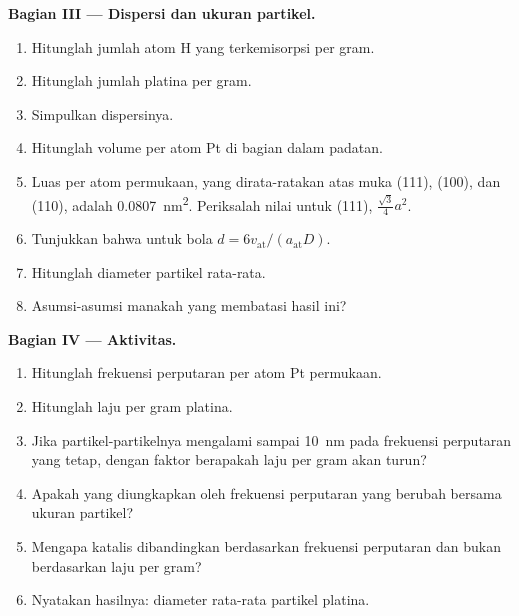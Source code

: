 \begin{problem}
\medskip\noindent\textbf{Bagian III --- Dispersi dan ukuran partikel.}
\begin{enumerate}[resume, beginpenalty=10000]
  \item Hitunglah jumlah atom H yang terkemisorpsi per gram.
  \item Hitunglah jumlah platina per gram.
  \item Simpulkan dispersinya.
  \item Hitunglah volume per atom Pt di bagian dalam padatan.
  \item Luas per atom permukaan, yang dirata-ratakan atas muka (111), (100), dan (110),
        adalah \qty{0.0807}{nm^2}. Periksalah nilai untuk (111), $\frac{\sqrt3}{4}a^2$.
  \item Tunjukkan bahwa untuk bola $d = 6v_{\mathrm{at}}/(a_{\mathrm{at}}D)$.
  \item Hitunglah diameter partikel rata-rata.
  \item Asumsi-asumsi manakah yang membatasi hasil ini?
\end{enumerate}

\medskip\noindent\textbf{Bagian IV --- Aktivitas.}
\begin{enumerate}[resume, beginpenalty=10000]
  \item Hitunglah frekuensi perputaran per atom Pt permukaan.
  \item Hitunglah laju per gram platina.
  \item Jika partikel-partikelnya mengalami  sampai \qty{10}{nm} pada frekuensi perputaran
        yang tetap, dengan faktor berapakah laju per gram akan turun?
  \item Apakah yang diungkapkan oleh frekuensi perputaran yang berubah bersama ukuran partikel?
  \item Mengapa katalis dibandingkan berdasarkan frekuensi perputaran dan bukan
        berdasarkan laju per gram?
  \item Nyatakan hasilnya: diameter rata-rata partikel platina.
\end{enumerate}
\end{problem}
